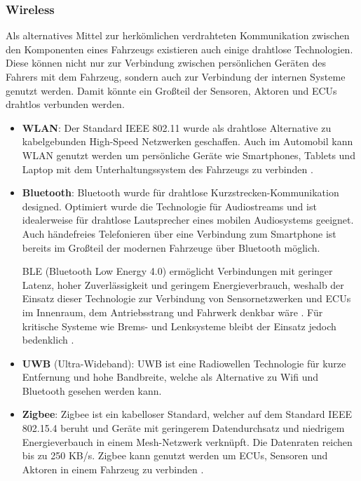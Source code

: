         \subsubsection{Wireless}
        Als alternatives Mittel zur herkömlichen verdrahteten Kommunikation zwischen den Komponenten eines Fahrzeugs existieren auch einige drahtlose Technologien.
        Diese können nicht nur zur Verbindung zwischen persönlichen Geräten des Fahrers mit dem Fahrzeug, sondern auch zur Verbindung der internen Systeme genutzt werden.
        Damit könnte ein Großteil der Sensoren, Aktoren und ECUs drahtlos verbunden werden.
            \begin{itemize}
                \item \textbf{WLAN}: Der Standard IEEE 802.11 wurde als drahtlose Alternative zu kabelgebunden High-Speed
                Netzwerken geschaffen. Auch im Automobil kann WLAN genutzt werden um persönliche Geräte wie Smartphones,
                Tablets und Laptop mit dem Unterhaltungssystem des Fahrzeugs zu verbinden \cite{TW_huang2018vehicle}. 
                \item \textbf{Bluetooth}: Bluetooth wurde für drahtlose Kurzstrecken-Kommunikation designed. Optimiert wurde die
                Technologie für Audiostreams und ist idealerweise für drahtlose Lautsprecher eines mobilen Audiosystems geeignet.
                Auch händefreies Telefonieren über eine Verbindung zum Smartphone ist bereits im Großteil der modernen Fahrzeuge 
                über Bluetooth möglich.
                
                BLE (Bluetooth Low Energy 4.0) ermöglicht Verbindungen mit geringer Latenz, hoher Zuverlässigkeit
                und geringem Energieverbrauch, weshalb der Einsatz dieser Technologie zur Verbindung von Sensornetzwerken und ECUs im Innenraum, 
                dem Antriebsstrang und Fahrwerk denkbar wäre \cite{TW_huang2018vehicle}. Für kritische Systeme wie Brems- und Lenksysteme bleibt der Einsatz jedoch bedenklich \cite{wolf2004security}.
                \item \textbf{UWB} (Ultra-Wideband): UWB ist eine Radiowellen Technologie für kurze Entfernung und hohe Bandbreite, welche als Alternative zu Wifi und Bluetooth gesehen werden kann.
                \item \textbf{Zigbee}: Zigbee ist ein kabelloser Standard, welcher auf dem Standard IEEE 802.15.4 beruht und Geräte mit geringerem Datendurchsatz und niedrigem Energieverbauch in einem 
                Mesh-Netzwerk verknüpft. Die Datenraten reichen bis zu 250 KB/s. Zigbee kann genutzt werden um ECUs, Sensoren und Aktoren in einem Fahrzeug zu verbinden \cite{TW_huang2018vehicle}.
            \end{itemize}
